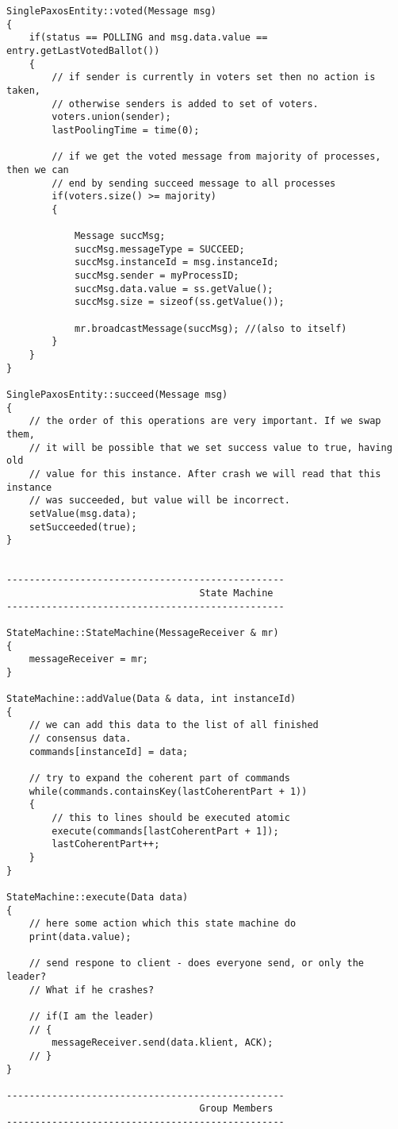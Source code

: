 {\begin{lstlisting}[frame=lines,caption=Pseudocode of Paxos algorithm]
SinglePaxosEntity::voted(Message msg)
{
	if(status == POLLING and msg.data.value == entry.getLastVotedBallot())
	{
		// if sender is currently in voters set then no action is taken,
		// otherwise senders is added to set of voters.
		voters.union(sender);
		lastPoolingTime = time(0);
		
		// if we get the voted message from majority of processes, then we can
		// end by sending succeed message to all processes
		if(voters.size() >= majority)
		{

			Message succMsg;
			succMsg.messageType = SUCCEED;
			succMsg.instanceId = msg.instanceId;
			succMsg.sender = myProcessID;
			succMsg.data.value = ss.getValue();
			succMsg.size = sizeof(ss.getValue());
			
			mr.broadcastMessage(succMsg); //(also to itself)
		}
	}
}

SinglePaxosEntity::succeed(Message msg)
{
	// the order of this operations are very important. If we swap them,
	// it will be possible that we set success value to true, having old
	// value for this instance. After crash we will read that this instance
	// was succeeded, but value will be incorrect.
	setValue(msg.data);
	setSucceeded(true);
}
			   
			   
-------------------------------------------------
                                  State Machine
-------------------------------------------------			   

StateMachine::StateMachine(MessageReceiver & mr)
{
	messageReceiver = mr;
}
			   
StateMachine::addValue(Data & data, int instanceId)
{
	// we can add this data to the list of all finished 
	// consensus data.
	commands[instanceId] = data;
	
	// try to expand the coherent part of commands
	while(commands.containsKey(lastCoherentPart + 1))
	{
		// this to lines should be executed atomic
		execute(commands[lastCoherentPart + 1]);
		lastCoherentPart++;
	}
}

StateMachine::execute(Data data)
{
	// here some action which this state machine do
	print(data.value);
	
	// send respone to client - does everyone send, or only the leader?
	// What if he crashes?
	
	// if(I am the leader)
	// {
		messageReceiver.send(data.klient, ACK);
	// }
}
			   
-------------------------------------------------
                                  Group Members
-------------------------------------------------


\end{lstlisting}}
